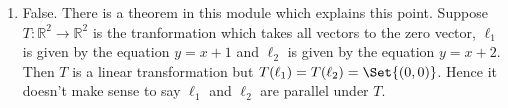 \begin{exercises}
\begin{problist}
\begin{solution}
\begin{enumerate}
				\item False. There is a theorem in this module which explains this
					point. Suppose $T:\mathbb{R}^{2}\rightarrow \mathbb{R}^{2}$
					is the tranformation which takes all vectors to the zero
					vector, $\ell_{1}$ is given by the equation $y=x+1$ and $\ell
					_{2}$ is given by the equation $y=x+2$. Then $T$ is a linear
					transformation but $T(\ell_{1})=T(\ell_{2})=\Set{(0,0)}$. Hence
					it doesn't make sense to say $\ell_{1}$ and $\ell_{2}$ are parallel
					under $T$.
			\end{enumerate}
		\end{solution}
	\end{problist}
\end{exercises}
